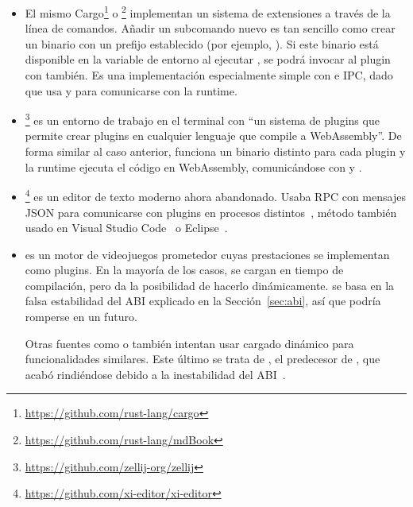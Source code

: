 \begin{itemize}
	\item El mismo Cargo\footnote{\url{https://github.com/rust-lang/cargo}} o
		\footnote{\url{https://github.com/rust-lang/mdBook}}
		implementan un sistema de extensiones a través de la línea de comandos.
		Añadir un subcomando nuevo es tan sencillo como crear un binario con un
		prefijo establecido (por ejemplo, ). Si este binario
		está disponible en la variable de entorno  al ejecutar
		, se podrá invocar al plugin con 
		también. Es una implementación especialmente simple con \pipes e IPC,
		dado que usa \stdin y \stdout para comunicarse con la runtime.

    \item {}\footnote{\url{https://github.com/zellij-org/zellij}} es
        un entorno de trabajo en el terminal con ``un sistema de plugins que
        permite crear plugins en cualquier lenguaje que compile a WebAssembly''.
		De forma similar al caso anterior, funciona un binario distinto para
		cada plugin y la runtime ejecuta el código en WebAssembly, comunicándose
		con \stdin y \stdout.

	\item {}\footnote{\url{https://github.com/xi-editor/xi-editor}} es un
		editor de texto moderno ahora abandonado. Usaba RPC con mensajes JSON
		para comunicarse con plugins en procesos distintos~\cite{xiplugin},
		método también usado en Visual Studio Code~\cite{vscodeplugin} o
		Eclipse~\cite{eclipseplugin}.

    \item {} es un motor de videojuegos prometedor cuyas
        prestaciones se implementan como plugins. En la mayoría de los casos, se
        cargan en tiempo de compilación, pero 
		da la posibilidad de hacerlo dinámicamente.  se basa en la
		falsa estabilidad del ABI explicado en la Sección~\ref{sec:abi}, así que
		podría romperse en un futuro.

        Otras fuentes como \textcite{dynloading1} o \textcite{dynloading2}
        también intentan usar cargado dinámico para funcionalidades similares.
        Este último se trata de , el predecesor de
        , que acabó rindiéndose debido a la inestabilidad del
        ABI~\cite{dynloading_giveup1}\cite{dynloading_giveup2}.

\end{itemize}

